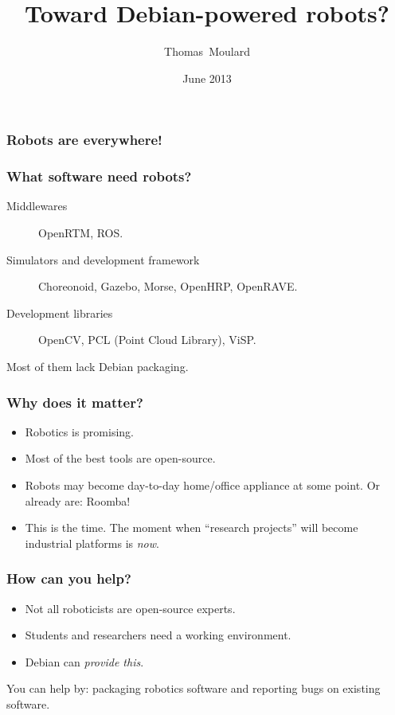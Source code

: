 \documentclass[14pt,utf8,hyperref={pdfpagelabels=false}]{beamer}
\title{Toward Debian-powered robots?}
\author[T\.~Moulard]{Thomas~Moulard}
\date{June 2013}
\begin{document}
{
  \begin{frame}[plain]
    \titlepage
  \end{frame}
}

\begin{slideDecision}
  \frametitle{Robots are everywhere!}

\end{slideDecision}


\begin{slideDecision}
  \frametitle{What software need robots?}

  \begin{description}
    \item[Middlewares] OpenRTM, ROS.
    \item[Simulators and development framework] Choreonoid, Gazebo,
      Morse, OpenHRP, OpenRAVE.
    \item[Development libraries] OpenCV, PCL (Point Cloud Library), ViSP.
  \end{description}

  Most of them lack Debian packaging.

\end{slideDecision}


\begin{slideDecision}
  \frametitle{Why does it matter?}

  \begin{itemize}
    \item Robotics is promising.
    \item Most of the best tools are open-source.
    \item Robots may become day-to-day home/office appliance at some
      point. Or already are: Roomba!
    \item This is the time. The moment when ``research projects'' will
      become industrial platforms is \emph{now}.
  \end{itemize}

\end{slideDecision}

\begin{slideDecision}
  \frametitle{How can you help?}

  \begin{itemize}
    \item Not all roboticists are open-source experts.
    \item Students and researchers need a working environment.
    \item Debian can \emph{provide this}.
  \end{itemize}

  \vspace{1cm}

  You can help by: packaging robotics software and reporting
  bugs on existing software.

\end{slideDecision}

\end{document}
